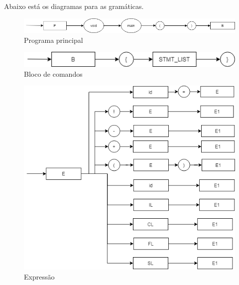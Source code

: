 \documentclass[]{article}
\numberwithin{equation}{section}
\begin{document}
Abaixo está os diagramas para as gramáticas.

\begin{center}
\begin{figure}[h!]
  \includegraphics[width=\linewidth]{./assets/program.png}
  \caption{Programa principal}
\end{figure}
\end{center}

\begin{center}
\begin{figure}[h!]
  \includegraphics[width=\linewidth]{./assets/code_block.png}
  \caption{Bloco de comandos}
\end{figure}
\end{center}

\begin{center}
\begin{figure}[h!]
  \includegraphics[width=\linewidth]{./assets/expr.png}
  \caption{Expressão}
\end{figure}
\end{center}
\end{document}
